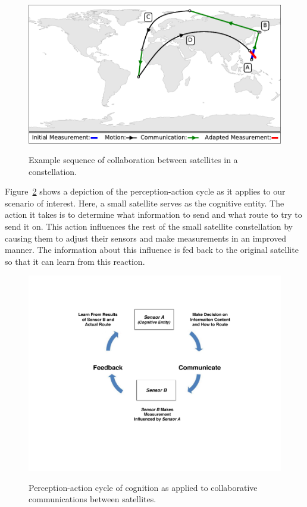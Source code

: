 \documentclass[conference]{IEEEtran}
\begin{document}
\begin{figure}[b!]
  \begin{center}
    \includegraphics[width=0.9\linewidth] {images/collaborate.pdf} \\
  \end{center}
  \caption{Example sequence of collaboration between satellites in a constellation.}
  \label{fig:figureColab}
\end{figure}

Figure~\ref{fig:figure2} shows a depiction of the perception-action cycle as it
applies to our scenario of interest.  Here, a small satellite serves as the
cognitive entity.  The action it takes is to determine what information to send
and what route to try to send it on.  This action influences the rest of the
small satellite constellation by causing them to adjust their sensors and make
measurements in an improved manner.  The information about this influence is fed
back to the original satellite so that it can learn from this reaction.

\begin{figure}[b!]
  \begin{center}
    \includegraphics[width=0.9\linewidth] {images/Figure2.pdf} \\
  \end{center}
  \caption{Perception-action cycle of cognition as applied to collaborative communications between satellites.}
  \label{fig:figure2}
\end{figure}
\end{document}
